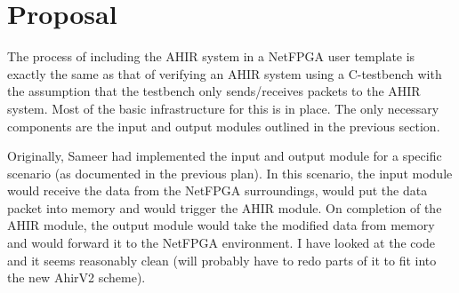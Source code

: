 \documentclass{article}
\begin{document}
\section{Proposal}

The process of including the AHIR system in a NetFPGA user template is
exactly the same as that of verifying an AHIR system using a C-testbench
with the assumption that the testbench only sends/receives packets to the AHIR 
system.  Most of the basic infrastructure for this is in place.  The only
necessary components are the input and output modules outlined in the 
previous section.

Originally, Sameer had implemented the input and output module for
a specific scenario (as documented in the previous plan).  In this
scenario, the input module would receive the data from the NetFPGA
surroundings, would put the data packet into memory and would trigger
the AHIR module.  On completion of the AHIR module, the output module
would take the modified data from memory and would forward it to
the NetFPGA environment.   I have looked at the code and it
seems reasonably clean (will probably have to redo parts of it
to fit into the new AhirV2 scheme). 
\end{document}
